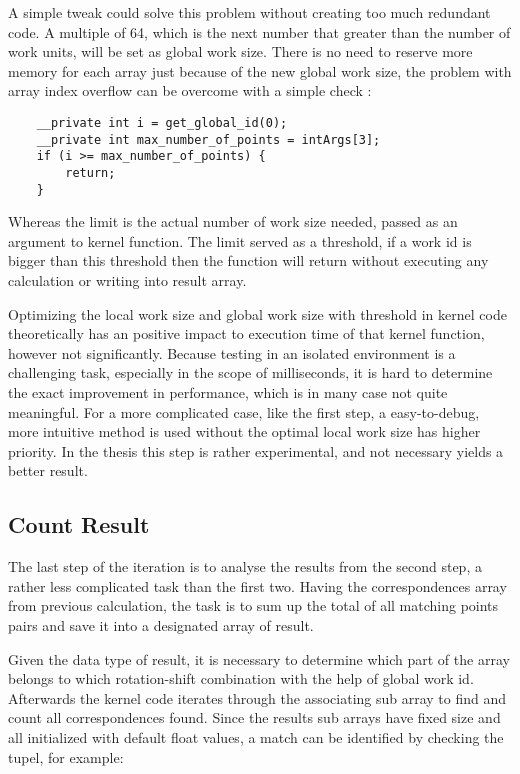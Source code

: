  A simple tweak could solve this problem without creating too much redundant code. A multiple of 64, which is the next number that greater than the number of work units, will be set as global work size. There is no need to reserve more memory for each array just because of the new global work size, the problem with array index overflow can be overcome with a simple check :

\begin{lstlisting}
	__private int i = get_global_id(0);
	__private int max_number_of_points = intArgs[3];
	if (i >= max_number_of_points) {
        return;
	}
\end{lstlisting}

Whereas the limit is the actual number of work size needed, passed as an argument to kernel function. The limit served as a threshold, if a work id is bigger than this threshold then the function will return without executing any calculation or writing into result array.

Optimizing the local work size and global work size with threshold in kernel code theoretically has an positive impact to execution time of that kernel function, however not significantly. Because testing in an isolated environment is a challenging task, especially in the scope of milliseconds, it is hard to determine the exact improvement in performance, which is in many case not quite meaningful. For a more complicated  case, like the first step, a easy-to-debug, more intuitive method is used without the optimal local work size has higher priority. In the thesis this step is rather experimental, and not necessary yields a better result. 

\subsection{Count Result}
The last step of the iteration is to analyse the results from the second step, a rather less complicated task than the first two. Having the correspondences array from previous calculation, the task is to sum up the total of all matching points pairs and save it into a designated array of result. 

Given the data type of result, it is necessary to determine which part of the array belongs to which rotation-shift combination with the help of global work id. Afterwards the kernel code iterates through the associating sub array to find and count all correspondences found. Since the results sub arrays have fixed size and all initialized with default float values, a match can be identified by checking the tupel, for example:

